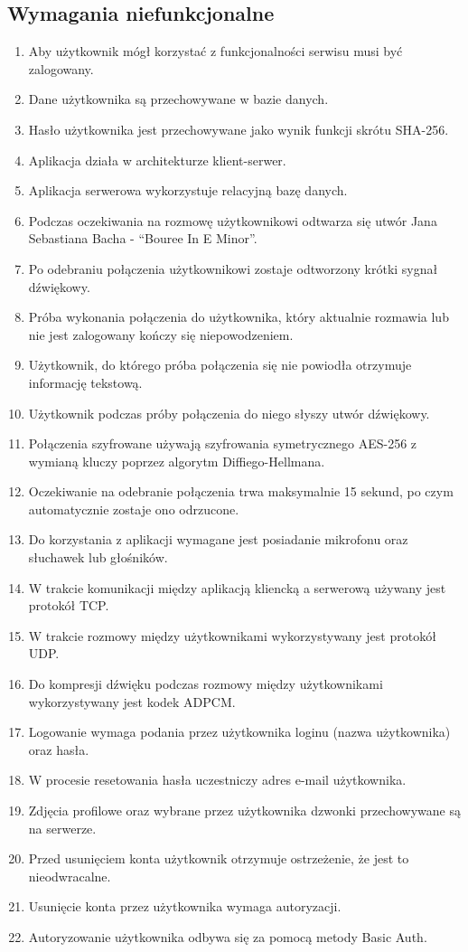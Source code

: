 \documentclass{article}
\begin{document}
  \subsection{Wymagania niefunkcjonalne}
  \begin{enumerate}
    \item Aby użytkownik mógł korzystać z funkcjonalności serwisu musi być zalogowany.
    \item Dane użytkownika są przechowywane w bazie danych.
    \item Hasło użytkownika jest przechowywane jako wynik funkcji skrótu SHA-256.
    \item Aplikacja działa w architekturze klient-serwer.
    \item Aplikacja serwerowa wykorzystuje relacyjną bazę danych.
    \item Podczas oczekiwania na rozmowę użytkownikowi odtwarza się utwór Jana Sebastiana Bacha - “Bouree In E Minor”.
    \item Po odebraniu połączenia użytkownikowi zostaje odtworzony krótki sygnał dźwiękowy.
    \item Próba wykonania połączenia do użytkownika, który aktualnie rozmawia lub nie jest zalogowany kończy się niepowodzeniem.
    \item Użytkownik, do którego próba połączenia się nie powiodła otrzymuje informację tekstową.
    \item Użytkownik podczas próby połączenia do niego słyszy utwór dźwiękowy.
    \item Połączenia szyfrowane używają szyfrowania symetrycznego AES-256 z wymianą kluczy poprzez algorytm Diffiego-Hellmana.
    \item Oczekiwanie na odebranie połączenia trwa maksymalnie 15 sekund, po czym automatycznie zostaje ono odrzucone.
    \item Do korzystania z aplikacji wymagane jest posiadanie mikrofonu oraz słuchawek lub głośników.
    \item W trakcie komunikacji między aplikacją kliencką a serwerową używany jest protokół TCP.
    \item W trakcie rozmowy między użytkownikami wykorzystywany jest protokół UDP.
    \item Do kompresji dźwięku podczas rozmowy między użytkownikami wykorzystywany jest kodek ADPCM.
    \item Logowanie wymaga podania przez użytkownika loginu (nazwa użytkownika) oraz hasła.
    \item W procesie resetowania hasła uczestniczy adres e-mail użytkownika.
    \item Zdjęcia profilowe oraz wybrane przez użytkownika dzwonki przechowywane są na serwerze.
    \item Przed usunięciem konta użytkownik otrzymuje ostrzeżenie, że jest to nieodwracalne.
    \item Usunięcie konta przez użytkownika wymaga autoryzacji.
    \item Autoryzowanie użytkownika odbywa się za pomocą metody Basic Auth.
  \end{enumerate}
\end{document}
